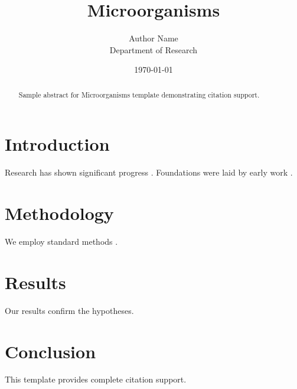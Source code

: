 \documentclass{mdpi}
\title{Microorganisms}
\author{Author Name \\ \small Department of Research}
\date{\today}
\begin{document}
\maketitle

\begin{abstract}
Sample abstract for Microorganisms template demonstrating citation support.
\end{abstract}

\section{Introduction}
Research has shown significant progress \citep{einstein1905}. Foundations were laid by early work \citep{turing1950}.

\section{Methodology}
We employ standard methods \citep{knuth1984}.

\section{Results}
Our results confirm the hypotheses.

\section{Conclusion}
This template provides complete citation support.



\end{document}

